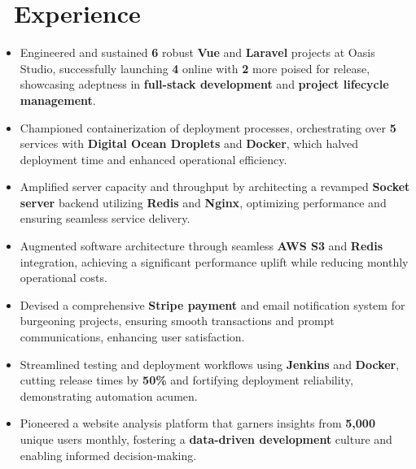 \documentclass{resume}
\begin{document}
\section{\faUsers\ Experience}
\begin{itemize}
 \item Engineered and sustained \textbf{6} robust \textbf{Vue} and \textbf{Laravel} projects at Oasis Studio, successfully launching \textbf{4} online with \textbf{2} more poised for release, showcasing adeptness in \textbf{full-stack development} and \textbf{project lifecycle management}.
 \item Championed containerization of deployment processes, orchestrating over \textbf{5} services with \textbf{Digital Ocean Droplets} and \textbf{Docker}, which halved deployment time and enhanced operational efficiency.
 \item Amplified server capacity and throughput by architecting a revamped \textbf{Socket server} backend utilizing \textbf{Redis} and \textbf{Nginx}, optimizing performance and ensuring seamless service delivery.
 \item Augmented software architecture through seamless \textbf{AWS S3} and \textbf{Redis} integration, achieving a significant performance uplift while reducing monthly operational costs.
 \item Devised a comprehensive \textbf{Stripe payment} and email notification system for burgeoning projects, ensuring smooth transactions and prompt communications, enhancing user satisfaction.
 \item Streamlined testing and deployment workflows using \textbf{Jenkins} and \textbf{Docker}, cutting release times by \textbf{50\%} and fortifying deployment reliability, demonstrating automation acumen.
 \item Pioneered a website analysis platform that garners insights from \textbf{5,000} unique users monthly, fostering a \textbf{data-driven development} culture and enabling informed decision-making.
\end{itemize}
\end{document}

